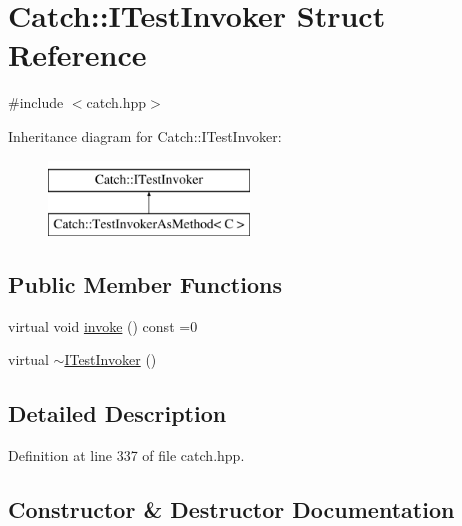 \hypertarget{struct_catch_1_1_i_test_invoker}{}\section{Catch\+:\+:I\+Test\+Invoker Struct Reference}
\label{struct_catch_1_1_i_test_invoker}


{\ttfamily \#include $<$catch.\+hpp$>$}

Inheritance diagram for Catch\+:\+:I\+Test\+Invoker\+:\begin{figure}[H]
\begin{center}
\leavevmode
\includegraphics[height=2.000000cm]{struct_catch_1_1_i_test_invoker}
\end{center}
\end{figure}
\subsection*{Public Member Functions}
\begin{DoxyCompactItemize}
\item 
virtual void \mbox{\hyperlink{struct_catch_1_1_i_test_invoker_a6fcd5c5b67d6d5ade6491ff33411ca7f}{invoke}} () const =0
\item 
virtual \mbox{\hyperlink{struct_catch_1_1_i_test_invoker_a2c89f3eece5b1b677243766e409bd831}{$\sim$\+I\+Test\+Invoker}} ()
\end{DoxyCompactItemize}


\subsection{Detailed Description}


Definition at line 337 of file catch.\+hpp.



\subsection{Constructor \& Destructor Documentation}
\mbox{\label{struct_catch_1_1_i_test_invoker_a2c89f3eece5b1b677243766e409bd831}} 
